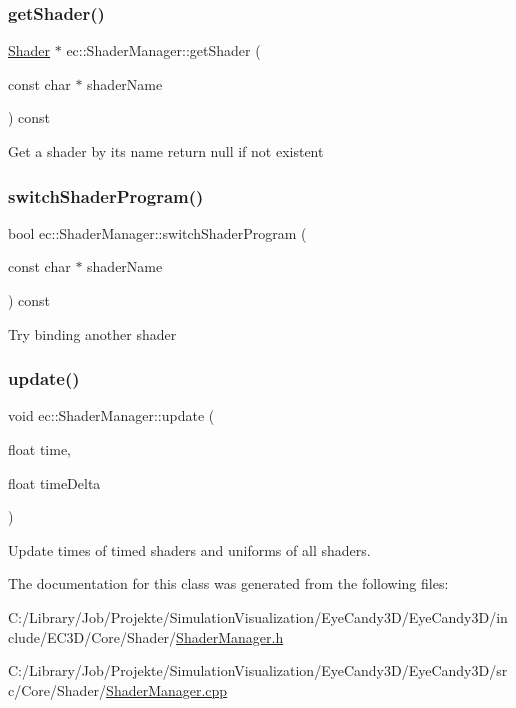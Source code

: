 \subsubsection{\texorpdfstring{get\+Shader()}{getShader()}}
{\footnotesize\ttfamily \mbox{\hyperlink{classec_1_1_shader}{Shader}} $\ast$ ec\+::\+Shader\+Manager\+::get\+Shader (\begin{DoxyParamCaption}\item[{const char $\ast$}]{shader\+Name }\end{DoxyParamCaption}) const}

Get a shader by its name return null if not existent \mbox{\label{classec_1_1_shader_manager_af42171dd2256a130b056d772e3190da0}} 
\subsubsection{\texorpdfstring{switch\+Shader\+Program()}{switchShaderProgram()}}
{\footnotesize\ttfamily bool ec\+::\+Shader\+Manager\+::switch\+Shader\+Program (\begin{DoxyParamCaption}\item[{const char $\ast$}]{shader\+Name }\end{DoxyParamCaption}) const}

Try binding another shader \mbox{\label{classec_1_1_shader_manager_ac5dc847819a1e8d154d8fd0280e488c1}} 
\subsubsection{\texorpdfstring{update()}{update()}}
{\footnotesize\ttfamily void ec\+::\+Shader\+Manager\+::update (\begin{DoxyParamCaption}\item[{float}]{time,  }\item[{float}]{time\+Delta }\end{DoxyParamCaption})}

Update times of timed shaders and uniforms of all shaders. 

The documentation for this class was generated from the following files\+:\begin{DoxyCompactItemize}
\item 
C\+:/\+Library/\+Job/\+Projekte/\+Simulation\+Visualization/\+Eye\+Candy3\+D/\+Eye\+Candy3\+D/include/\+E\+C3\+D/\+Core/\+Shader/\mbox{\hyperlink{_shader_manager_8h}{Shader\+Manager.\+h}}\item 
C\+:/\+Library/\+Job/\+Projekte/\+Simulation\+Visualization/\+Eye\+Candy3\+D/\+Eye\+Candy3\+D/src/\+Core/\+Shader/\mbox{\hyperlink{_shader_manager_8cpp}{Shader\+Manager.\+cpp}}\end{DoxyCompactItemize}
